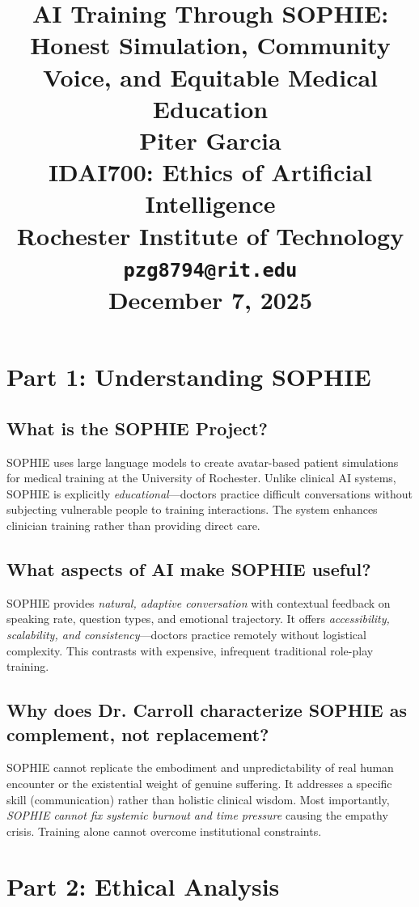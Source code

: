 \documentclass[12pt,twoside]{article}
\title{
\vspace*{1.5in}
\textbf{\Huge AI Training Through SOPHIE:}\\[0.5em]
\textbf{\Huge Honest Simulation, Community Voice, and Equitable Medical Education}\\[1.5em]

\vfill
\Huge \textbf{Piter Garcia}\\
\LARGE IDAI700: Ethics of Artificial Intelligence\\
Rochester Institute of Technology\\
\texttt{pzg8794@rit.edu}\\

\vfill
\Huge \textbf{December 7, 2025}
}
\author{}
\date{}
\begin{document}
\thispagestyle{empty}
\maketitle
\newpage

\pagestyle{fancy}

\section*{Part 1: Understanding SOPHIE}

\subsection*{What is the SOPHIE Project?}

SOPHIE uses large language models to create avatar-based patient simulations for medical training at the University of Rochester. Unlike clinical AI systems, SOPHIE is explicitly \emph{educational}—doctors practice difficult conversations without subjecting vulnerable people to training interactions. The system enhances clinician training rather than providing direct care.

\subsection*{What aspects of AI make SOPHIE useful?}

SOPHIE provides \emph{natural, adaptive conversation} with contextual feedback on speaking rate, question types, and emotional trajectory. It offers \emph{accessibility, scalability, and consistency}—doctors practice remotely without logistical complexity. This contrasts with expensive, infrequent traditional role-play training.

\subsection*{Why does Dr. Carroll characterize SOPHIE as complement, not replacement?}

SOPHIE cannot replicate the embodiment and unpredictability of real human encounter or the existential weight of genuine suffering. It addresses a specific skill (communication) rather than holistic clinical wisdom. Most importantly, \emph{SOPHIE cannot fix systemic burnout and time pressure} causing the empathy crisis. Training alone cannot overcome institutional constraints.

\section*{Part 2: Ethical Analysis}
\end{document}
